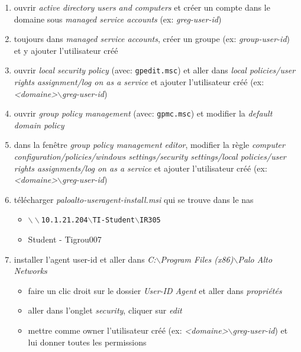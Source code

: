 \documentclass[a4paper]{article}
\begin{document}
\begin{enumerate}
    \item ouvrir \textit{active directory users and computers} et créer un compte dans le domaine sous \textit{managed service accounts} (ex: \textit{greg-user-id})
    \item toujours dans \textit{managed service accounts}, créer un groupe (ex: \textit{group-user-id}) et y ajouter l'utilisateur créé
    \item ouvrir \textit{local security policy} (avec: \texttt{gpedit.msc}) et aller dans \textit{local policies/user rights assignment/log on as a service} et ajouter l'utilisateur créé (ex: \textit{<domaine>$\backslash$greg-user-id})
    \item ouvrir \textit{group policy management} (avec: \texttt{gpmc.msc}) et modifier la \textit{default domain policy}
    \item dans la fenêtre \textit{group policy management editor}, modifier la règle \textit{computer configuration/policies/windows settings/security settings/local policies/user rights assignments/log on as a service} et ajouter l'utilisateur créé (ex: \textit{<domaine>$\backslash$greg-user-id})
    \item télécharger \textit{paloalto-useragent-install.msi} qui se trouve dans le nas
    \begin{example}
        \begin{itemize}
            \item \texttt{$\backslash\backslash$10.1.21.204$\backslash$TI-Student$\backslash$IR305}
            \item Student - Tigrou007
        \end{itemize}
    \end{example}
    \item installer l'agent user-id et aller dans \textit{C:$\backslash$Program Files (x86)$\backslash$Palo Alto Networks}
    \begin{example}
        \begin{itemize}
            \item faire un clic droit sur le dossier \textit{User-ID Agent} et aller dans \textit{propriétés}
            \item aller dans l'onglet \textit{security}, cliquer sur \textit{edit}
            \item mettre comme owner l'utilisateur créé (ex: \textit{<domaine>$\backslash$greg-user-id}) et lui donner toutes les permissions
        \end{itemize}

\end{example}
\end{enumerate}
\end{document}
